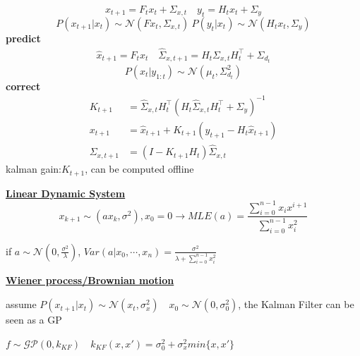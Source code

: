 \documentclass[landscape,a0paper,fontscale=0.285]{baposter} %
\begin{document}
\begin{poster}
{\colorbox[HTML]{CCFFFF}{}\vspace{-0.3cm}
$$
x_{t+1} = F_tx_{t} + \Sigma_{x,t} \quad y_t  = H_t x_t + \Sigma_y
$$
$$
P(x_{t+1}|x_t) \sim \mathcal N(Fx_t, \Sigma_{x,t})
~
P(y_t | x_t) \sim \mathcal N(H_t x_t, \Sigma_y)
$$
\textbf{predict}\vspace{-0.4cm}
$$
\begin{aligned}
\hat x_{t+1} = F_t x_t \quad \hat \Sigma_{x,t+1} = H_t \Sigma_{x,t}H_t^\top + \Sigma_{d_t}
\end{aligned}
$$
$$
P(x_t|y_{1:t}) \sim \mathcal N(\mu_t, \Sigma_{d_t}^2)
$$
\textbf{correct}\vspace{-0.3cm}
$$
\begin{aligned}
K_{t+1} &= \hat \Sigma_{x,t}H_t^\top (H_t\hat \Sigma_{x,t}H_t^\top + \Sigma_y)^{-1}
\\
x_{t+1} &= \hat x_{t+1} + K_{t+1}(y_{t+1}-H_t\hat x_{t+1})\\
\Sigma_{x,t+1} &= (I-K_{t+1}H_t)\hat \Sigma_{x,t}
\end{aligned}
$$
kalman gain:$K_{t+1}$, can be computed offline

\underline{\textbf{Linear  Dynamic System}}
\vspace{-0.5cm}
$$
x_{k+1} \sim (a x_k,\sigma^2) , x_0=0 \rightarrow MLE(a) = \frac{\sum_{i=0}^{n-1}x_ix^{i+1}}{\sum_{i=0}^{n-1}x_i^2}
$$

if $a\sim \mathcal N(0, \frac{\sigma^2}{\lambda})$, $Var(a|x_0,\cdots,x_n) = \frac{\sigma^2}{\lambda + \sum_{i=0}^{n-1}x_i^2}$

\underline{\textbf{Wiener process/Brownian motion}}

assume $P(x_{t+1}|x_t)\sim\mathcal N(x_t,\sigma_x^2)\quad x_0\sim\mathcal N(0,\sigma_0^2)$, the Kalman Filter can be seen as a GP

$f\sim \mathcal{GP}(0, k_{KF})\quad k_{KF}(x,x') = \sigma_0^2 + \sigma_x^2 min\{x,x'\}$

}
\end{poster}
\end{document}
